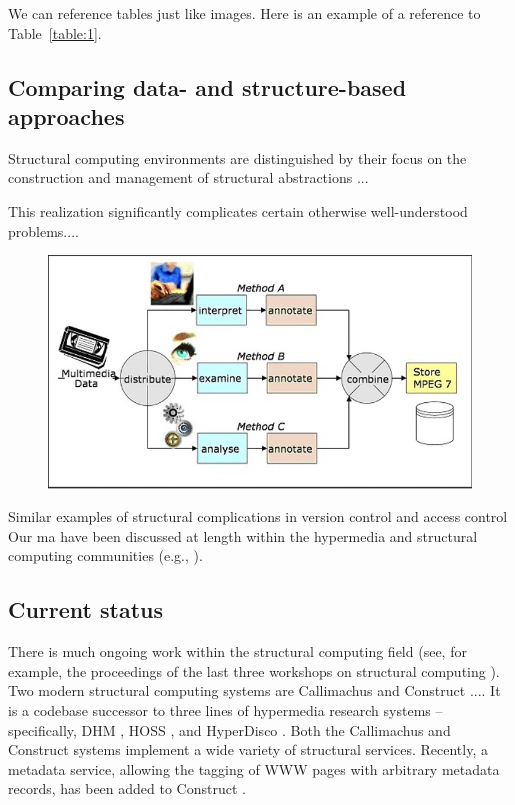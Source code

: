 \documentclass[10pt, a4paper, oneside]{article}
\begin{document}
We can reference tables just like images. Here is an example of a reference to Table~\ref{table:1}.

\subsection{Comparing data- and structure-based approaches}

Structural computing environments are distinguished by their focus on
the construction and management of structural abstractions ...

This realization significantly complicates certain otherwise
well-understood problems....  

\begin{figure}[h]
    \includegraphics[width=\textwidth]{figure1.jpg}
    \centering
    \captionsetup{font=small}
    \caption{\fontsize{10pt}{11pt}}
    \label{fig:1}
\end{figure}

Similar examples of structural complications in version control and
access control Our ma have been discussed at length within the hypermedia and
structural computing communities (e.g., \cite{tois-ver, hoss}).


\subsection{Current status}

There is much ongoing work within the structural computing field (see,
for example, the proceedings of the last three workshops on structural
computing \cite{sc2-proc, sc1-proc, sc3-proc}).  Two modern structural
computing systems are Callimachus \cite{callimachus} and Construct
\cite{construct}....  It is a codebase
successor to three lines of hypermedia research systems --
specifically, DHM \cite{dhm}, HOSS \cite{hoss}, and HyperDisco
\cite{hyperdisco}.  Both the Callimachus and Construct systems
implement a wide variety of structural services.  Recently, a metadata
service, allowing the tagging of WWW pages with arbitrary metadata
records, has been added to Construct \cite{construct-md}.
\end{document}
